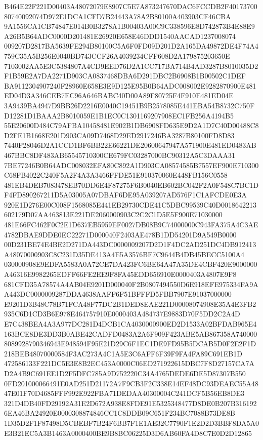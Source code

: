 \documentclass[UTF8,fontset=fandol,zihao=-4,a4paper]{ctexart}
\begin{document}
{{B464E22F221D00403A48072079E8907C5E7A873247670DAC6FCCDB2F4017370080740092074D972E1DCA1CFD7B24443A78A2B80100A403903CF46CBA
9A1556CA1CB74847E014B0B3278A1B00403A00C9C338596E8D742873B4E88E9A26B5B64ADC0000D201481E26920E658E46DDD1540AACAD1237008074
009207D2817BA5639FE294B80100C5A6F0FD09D201D2A165DA49872DE4F74A4759C35A5B256E0040BD743CCF26A4039234CFF608D2A179875203650E
7103002AA5E3C5384807A4CD9EED76D2A1CC717BA714B4AD3287B8010035D2F1B59E2A7DA2271D903CA0837468DBA6D291DBC2B6908B1B00502C1DEF
BA9112304907240F28960E658E3E9D125E95B0B64ADC008002E9282870900E481ED04D3A346CEB7EC96A646BABC40D00A89F80725F4F910E481ED04E
3A9439BA4947D9BB26D2216E0040C19451B9B2578085E441EBA54B8732C750FD12281D1BAAA2B8010059E1B1EC0C1301169207908EC1FB256A4194B5
55E20600D484C79AFBA10458481E902B1DB6908FD635E9D2A1D7C40D00488C8D2FE1B1668E201D903CA09D7468D29ED2917246BA3287B80100FD8D83
7440F28046D2A1CCD1BF6BB22E66221DE20600647947A571900E481ED0483AB467BBC8DF483AB65545710300CE679FC03287000BC90312A5C3DAAA31
7BE77246B0B64ADC008032EFA80C892A1D903CA08574585B7557EF900E710300C68FB4022C240F5A2F4A3A3466FFDE51E910370060E448FB156C0558
481EB4DEB7083478EB70DD6E4F87275F6B0040EB602BC042F2A0F548C7BC1DF4FD890267211D5A03005A07DBAF6DE95A039207AD576F1C1AFCDE0E3A
920E1D276E00C008F1568085E441EB29730CDE41C5DBC99539C40D0018642213602179D07AA463813E221DE2060000903C2C2C1D5E5F900E71030000
481E66FC462F0C2E1D637EB5959EF0027DB08B9C74000000C943FA375A4C3AE4782DBAE9DDE0EC22271D000040F2403AE478B1DD54201D9A549B0000
00D231BE74E4BE2D271DA443DC0000009207D2D1F4DC2AD251DC4DB912413A48070000903C8C231D35DE413A4E5A3576BF7C9644B4DB45BECC5100A4
030000908E9EDFA5583A0A72CE7DA423FC6BE64A47A35DE4CBF420E9000000A46316E9982265EDFF66FE2EE9F8FA45EDD656910E0000403A4807E9F8
681CFD35A78574A4AB04E9201D000040F2B0807494550D6E918EFE975334FA9AA443DC0000009287DDA4638AAFF6F51BFFFD5FBB7907E91037000000
E9201D3B48C78B71FCA48F77DC2B1DED8EAE221D00008074908E35A4E3FB2935C6D1CD3B6E978E464757910E0000403A484737E9883D70F5DD2C2A4D
E7C438BEA4A3A977DC281D4DCB1CA4030000900ED2D1533A02BFDAB965E4163BCE8DE3DD3B0ABE42CADFD0483A2A6F909F423ABE5AB867358A740000
8089928790346943E948594F95E21D29C6F1EC1DE9FD95B5DCAB5D0F2E2F1D218BEB48070000584F3AC273A4C1A5E3C6AFF6F39F9FA4FA89C691EB1D
472586133F221DC5E3E8B2EC453A0000C06ED271922615DBC7F8D27157CA7AD2A4B9C691EE1D2F5DFC785A9D752220C34A4765DEDE6DE5D87307B550
0FD201000066491E0AD251D21172A7F9CB3F2C338E14EF48DC93DEAEC55A4847E01F70D4685FFF992E922FBA71DEDAA40300004C241DCF5B56EB8DE3
321D4DB40FD29192A31E2D672A938E8FDE91E5325348477D8DE0B207B3161926EA46BA24920E0000308874846CC1C8DDB09C651F234BC7088B73DE8B
1D35D2F1F87498D5CBEBF7B24F6BB7F1E1AE32C7790F1E2D2D3BBF8DA5A0E3B21EC5A3B1463A0000400BE9B8BC06225D3D6AB60FA4D8C7E0D2D12865
}}
\end{document}
